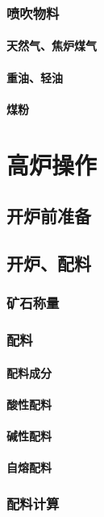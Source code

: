 \documentclass[UTF8]{../../ApplicationUniverse}
\begin{document}
        \subsubsection{喷吹物料}
            \paragraph{天然气、焦炉煤气}
            \paragraph{重油、轻油}
            \paragraph{煤粉}
\section{高炉操作}
    \subsection{开炉前准备}
    \subsection{开炉、配料}
        \subsubsection{矿石称量}
        \subsubsection{配料}
            \paragraph{配料成分}
            \paragraph{酸性配料}
            \paragraph{碱性配料}
            \paragraph{自熔配料}
        \subsubsection{配料计算}
\end{document}
